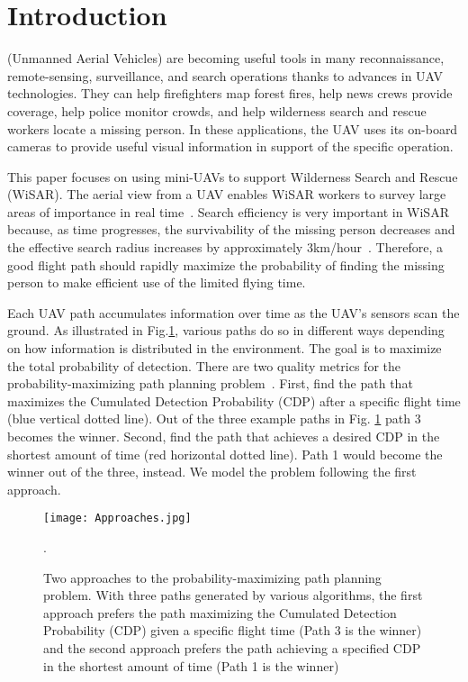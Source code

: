\documentclass[journal]{IEEEtran}
\begin{document}
\section{Introduction}
\label{sec:Introduction}

 (Unmanned Aerial Vehicles) are becoming useful tools in many reconnaissance, remote-sensing, surveillance, and search operations thanks to advances in UAV technologies. They can help firefighters map forest fires, help news crews provide coverage, help police monitor crowds, and help wilderness search and rescue workers locate a missing person. In these applications, the UAV uses its on-board cameras to provide useful visual information in support of the specific operation.

This paper focuses on using mini-UAVs to support Wilderness Search and Rescue (WiSAR). The aerial view from a UAV enables WiSAR workers to survey large areas of importance in real time~\cite{Goodrich2008FieldReport}. Search efficiency is very important in WiSAR because, as time progresses, the survivability of the missing person decreases and the effective search radius increases by approximately 3km/hour~\cite{Syrotuck2000Intro}. Therefore, a good flight path should rapidly maximize the probability of finding the missing person to make efficient use of the limited flying time.

Each UAV path accumulates information over time as the UAV's sensors scan the ground. As illustrated in Fig.\ref{TwoApproaches}, various paths do so in different ways depending on how information is distributed in the environment. The goal is to maximize the total probability of detection. There are two quality metrics for the probability-maximizing path planning problem~\cite{koopman1957theory, stone1975theory, washburn1981search}. First, find the path that maximizes the Cumulated Detection Probability (CDP) after a specific flight time (blue vertical dotted line). Out of the three example paths in Fig.
\ref{TwoApproaches} path 3 becomes the winner. Second, find the path that achieves a desired CDP in the shortest amount of time (red horizontal dotted line). Path 1 would become the winner out of the three, instead. We model the problem following the first approach.
\begin{figure}
\centering
\texttt{[image: Approaches.jpg]}
\caption{Two approaches to the probability-maximizing path planning problem. With three paths generated by various algorithms, the first approach prefers the path maximizing the Cumulated Detection Probability (CDP) given a specific flight time (Path 3 is the winner) and the second approach prefers the path achieving a specified CDP in the shortest amount of time (Path 1 is the winner)}. 
\label{TwoApproaches}
\end{figure}
\end{document}
